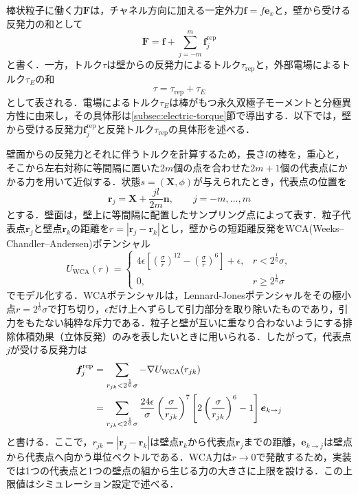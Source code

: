 \documentclass[dvipdfmx]{ampbt}
\begin{document}
  棒状粒子に働く力$\bm{F}$は，チャネル方向に加える一定外力$\bm{f}=f\bm{e}_x$と，壁から受ける反発力の和として
  \begin{equation}
    \bm{F}=\bm{f}+\sum_{j=-m}^{m}\bm{f}^{\mathrm{rep}}_j
    \label{eq:force}
  \end{equation}
  と書く．一方，トルク$\tau$は壁からの反発力によるトルク$\tau_{\mathrm{rep}}$と，外部電場によるトルク$\tau_E$の和
  \begin{equation}
    \tau=\tau_{\mathrm{rep}}+\tau_E
  \end{equation}
  として表される．電場によるトルク$\tau_E$は棒がもつ永久双極子モーメントと分極異方性に由来し，その具体形は\ref{subsec:electric-torque}節で導出する．以下では，壁から受ける反発力$\bm{f}^{\mathrm{rep}}_j$と反発トルク$\tau_{\mathrm{rep}}$の具体形を述べる．

  壁面からの反発力とそれに伴うトルクを計算するため，長さ$l$の棒を，重心と，そこから左右対称に等間隔に置いた$2m$個の点を合わせた$2m+1$個の代表点にかかる力を用いて近似する．状態$s=(\bm{X},\phi)$が与えられたとき，代表点の位置を
  \begin{equation}
    \bm{r}_j=\bm{X}+\frac{jl}{2m}\bm{n},\qquad j=-m,\ldots,m
    \label{eq:representative-points}
  \end{equation}
  とする．壁面は，壁上に等間隔に配置したサンプリング点によって表す．粒子代表点$\bm{r}_j$と壁点$\bm{r}_k$の距離を$r=|\bm{r}_j-\bm{r}_k|$とし，壁からの短距離反発をWCA(Weeks--Chandler--Andersen)ポテンシャル
  \begin{equation}
    U_{\mathrm{WCA}}(r)=
    \begin{cases}
      \displaystyle
      4\epsilon
      \left[
        \left(\frac{\sigma}{r}\right)^{12}
        -
        \left(\frac{\sigma}{r}\right)^6
        \right]
      +\epsilon,
       & r<2^{\frac{1}{6}}\sigma,    \\[8pt]
      0,
       & r\geq 2^{\frac{1}{6}}\sigma
    \end{cases}
    \label{eq:wca}
  \end{equation}
  でモデル化する．WCAポテンシャルは，Lennard-Jonesポテンシャルをその極小点$r=2^{\frac{1}{6}}\sigma$で打ち切り，$\epsilon$だけ上へずらして引力部分を取り除いたものであり，引力をもたない純粋な斥力である．粒子と壁が互いに重なり合わないようにする排除体積効果（立体反発）のみを表したいときに用いられる．したがって，代表点$j$が受ける反発力は
  \begin{align}
    \bm{f}^{\mathrm{rep}}_j
     & =
    \sum_{r_{jk}<2^{\frac{1}{6}}\sigma}
    -\nabla U_{\mathrm{WCA}}(r_{jk}) \notag \\
     & =
    \sum_{r_{jk}<2^{\frac{1}{6}}\sigma}
    \frac{24\epsilon}{\sigma}
    \left(\frac{\sigma}{r_{jk}}\right)^{7}
    \left[
      2\left(\frac{\sigma}{r_{jk}}\right)^{6}-1
      \right]
    \bm{e}_{k\to j}
    \label{eq:wca-force}
  \end{align}
  と書ける．ここで，$r_{jk}=|\bm{r}_j-\bm{r}_k|$は壁点$\bm{r}_k$から代表点$\bm{r}_j$までの距離，$\bm{e}_{k\to j}$は壁点から代表点へ向かう単位ベクトルである．WCA力は$r\to 0$で発散するため，実装では1つの代表点と1つの壁点の組から生じる力の大きさに上限を設ける．この上限値はシミュレーション設定で述べる．
\end{document}
